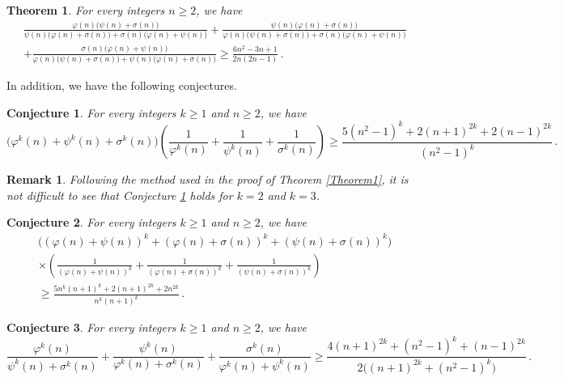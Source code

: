 \documentclass[12pt]{article}
\newtheorem{theorem}{Theorem}
\newtheorem{remark}{Remark}
\newtheorem{conjecture}{Conjecture}
\begin{document}
\begin{theorem}\label{Theorem6}
For every integers $n\geq2$, we have
\begin{align}\label{lowerbound6}
&\frac{\varphi(n)\big(\psi(n)+\sigma(n)\big)}{\psi(n)\big(\varphi(n)+\sigma(n)\big)+\sigma(n)\big(\varphi(n)+\psi(n)\big)}
+\frac{\psi(n)\big(\varphi(n)+\sigma(n)\big)}{\varphi(n)\big(\psi(n)+\sigma(n)\big)+\sigma(n)\big(\varphi(n)+\psi(n)\big)}\nonumber\\
&+\frac{\sigma(n)\big(\varphi(n)+\psi(n)\big)}{\varphi(n)\big(\psi(n)+\sigma(n)\big)+\psi(n)\big(\varphi(n)+\sigma(n)\big)}\geq\frac{6n^2-3n+1}{2n(2n-1)}\,.
\end{align}
\end{theorem}



In addition, we have the following conjectures.
\begin{conjecture}\label{Conjecture1}
For every integers $k\geq1$ and $n\geq2$, we have
\begin{equation*}
\big(\varphi^k(n)+\psi^k(n)+\sigma^k(n)\big)\left(\frac{1}{\varphi^k(n)}+\frac{1}{\psi^k(n)}+\frac{1}{\sigma^k(n)}\right)\geq\frac{5(n^2-1)^k+2(n+1)^{2k}+2(n-1)^{2k}}{(n^2-1)^k}\,. 
\end{equation*}
\end{conjecture}

\begin{remark} 
Following the method used in the proof of Theorem \ref{Theorem1}, it is not difficult to see that Conjecture \ref{Conjecture1} holds for $k=2$ and $k=3$.
\end{remark}


\begin{conjecture}\label{Conjecture2}
For every integers $k\geq1$ and $n\geq2$, we have
\begin{align*}
&\big((\varphi(n)+\psi(n))^k +(\varphi(n)+\sigma(n))^k+(\psi(n)+\sigma(n))^k\big)\\
&\times\left(\frac{1}{(\varphi(n)+\psi(n))^k}+\frac{1}{(\varphi(n)+\sigma(n))^k}+\frac{1}{(\psi(n)+\sigma(n))^k}\right)\\ 
&\geq\frac{5n^k(n+1)^k+2(n+1)^{2k}+2n^{2k}}{n^k(n+1)^k}\,.
\end{align*}
\end{conjecture}


\begin{conjecture}\label{Conjecture3}
For every integers $k\geq1$ and $n\geq2$, we have
\begin{equation*}
\frac{\varphi^k(n)}{\psi^k(n)+\sigma^k(n)}+\frac{\psi^k(n)}{\varphi^k(n)+\sigma^k(n)}+\frac{\sigma^k(n)}{\varphi^k(n)+\psi^k(n)}\geq\frac{4(n+1)^{2k}+(n^2-1)^k+(n-1)^{2k}}{2\big((n+1)^{2k}+(n^2-1)^k\big)}\,. 
\end{equation*}
\end{conjecture}
\end{document}
